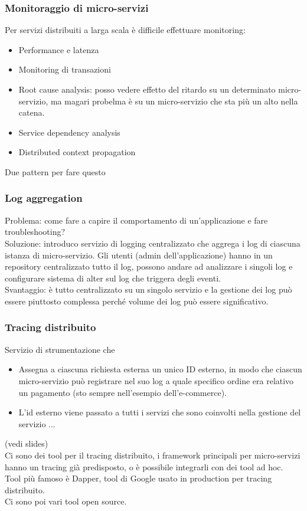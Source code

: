 \documentclass{article}
\begin{document}
\subsubsection{Monitoraggio di micro-servizi}
Per servizi distribuiti a larga scala è difficile effettuare monitoring:
\begin{itemize}
\item Performance e latenza
\item Monitoring di transazioni
\item Root cause analysis: posso vedere effetto del ritardo su un determinato micro-servizio, ma magari probelma è su un micro-servizio che sta più un alto nella catena.
\item Service dependency analysis
\item Distributed context propagation
\end{itemize}
Due pattern per fare questo
\subsubsection{Log aggregation}
Problema: come fare a capire il comportamento di un'applicazione e fare troubleshooting? \\ Soluzione: introduco servizio di logging centralizzato che aggrega i log di ciascuna istanza di micro-servizio. Gli utenti (admin dell'applicazione) hanno in un repository centralizzato tutto il log, possono andare ad analizzare i singoli log e configurare sistema di alter sul log che triggera degli eventi.\\ Svantaggio: è tutto centralizzato su un singolo servizio e la gestione dei log può essere piuttosto complessa perché volume dei log può essere significativo.
\subsubsection{Tracing distribuito}
Servizio di strumentazione che 
\begin{itemize}
\item Assegna a ciascuna richiesta esterna un unico ID esterno, in modo che ciascun micro-servizio può registrare nel suo log a quale specifico ordine era relativo un pagamento (sto sempre nell'esempio dell'e-commerce).
\item L'id esterno viene passato a tutti i servizi che sono coinvolti nella gestione del servizio
...
\end{itemize}
(vedi slides)\\
Ci sono dei tool per il tracing distribuito, i framework principali per micro-servizi hanno un tracing già predisposto, o è possibile integrarli con dei tool ad hoc.\\ Tool più famoso è Dapper, tool di Google usato in production per tracing distribuito.\\ Ci sono poi vari tool open source. 
\end{document}
